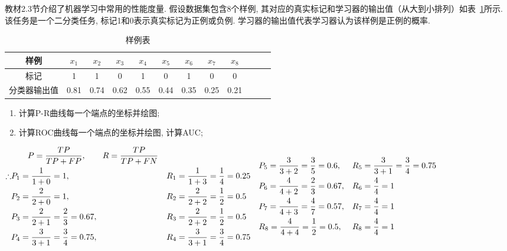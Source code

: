 \documentclass[answers]{exam}  %
\begin{document}
\begin{questions}
	教材2.3节介绍了机器学习中常用的性能度量. 假设数据集包含8个样例, 其对应的真实标记和学习器的输出值（从大到小排列）如表~\ref{table:roc}所示. 该任务是一个二分类任务, 标记1和0表示真实标记为正例或负例.
学习器的输出值代表学习器认为该样例是正例的概率. 
\begin{table}[!h]
	\centering
	\caption{样例表} \vspace{2mm}\label{table:roc}
	\begin{tabular}{c|c c c c c c c c c c c}\toprule
		样例 & $x_1$ & $x_2$ & $x_3$  & $x_4$  & $x_5$& $x_{6}$& $x_{7}$ & $x_{8}$  \\
		\midrule
		标记 & 1  & 1 &  0 &  1  & 0 & 1 & 0 & 0\\
		\midrule
		分类器输出值 & 0.81 &  0.74 &  0.62  & 0.55 & 0.44 &0.35 & 0.25 & 0.21\\
		\bottomrule
	\end{tabular}
\end{table}
\begin{enumerate}
    \item 计算P-R曲线每一个端点的坐标并绘图;
    \item 计算ROC曲线每一个端点的坐标并绘图, 计算AUC;
\end{enumerate}
	\begin{solution}
		$
	    \begin{aligned}
			&\quad\quad P=\frac{TP}{TP+FP},\quad\quad R=\frac{TP}{TP+FN}\\
			\therefore&P_1=\frac{1}{1+0}=1,&&R_1=\frac{1}{1+3}=\frac14=0.25\\
			&P_2=\frac{2}{2+0}=1,&&R_2=\frac{2}{2+2}=\frac12=0.5\\
			&P_3=\frac{2}{2+1}=\frac23=0.67,&&R_3=\frac{2}{2+2}=\frac12=0.5\\
			&P_4=\frac{3}{3+1}=\frac34=0.75,&&R_4=\frac{3}{3+1}=\frac34=0.75\\
		\end{aligned}\\
		\begin{aligned}
			&P_5=\frac{3}{3+2}=\frac35=0.6,&&R_5=\frac{3}{3+1}=\frac34=0.75\\
			&P_6=\frac{4}{4+2}=\frac23=0.67,&&R_6=\frac{4}{4}=1\\
			&P_7=\frac{4}{4+3}=\frac47=0.57,&&R_7=\frac{4}{4}=1\\
			&R_8=\frac{4}{4+4}=\frac12=0.5,&&R_8=\frac{4}{4}=1\\
		\end{aligned}\\
		$

\end{solution}
\end{questions}
\end{document}

